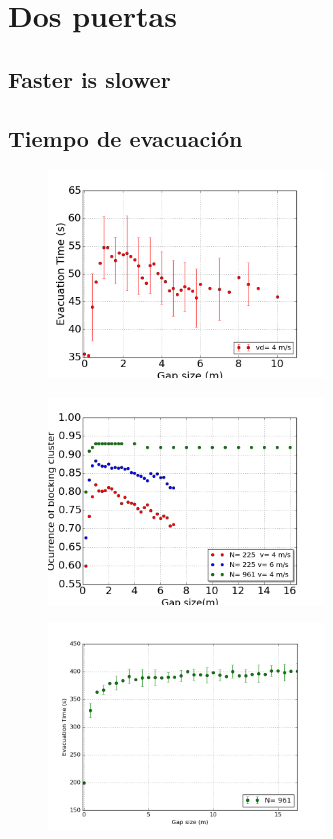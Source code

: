 \section{Dos puertas}

\subsection{Faster is slower}

\subsection{Tiempo de evacuación}

\begin{figure}[H]
    \centering
    \includegraphics[height=5.5cm]{figuras/gap_vste_225p.png}
    \caption[width=5cm]{\centering\textit{}}
    \label{sintesis}
\end{figure}

\begin{figure}[H]
    \centering
    \includegraphics[height=5.5cm]{figuras/gap_vsten_all.png}
    \caption[width=5cm]{\centering\textit{}}
    \label{sintesis}
\end{figure}

\begin{figure}[H]
    \centering
    \includegraphics[height=5.5cm]{figuras/gap_vste_v4_961p.png}
    \caption[width=5cm]{\centering\textit{}}
    \label{sintesis}
\end{figure}

